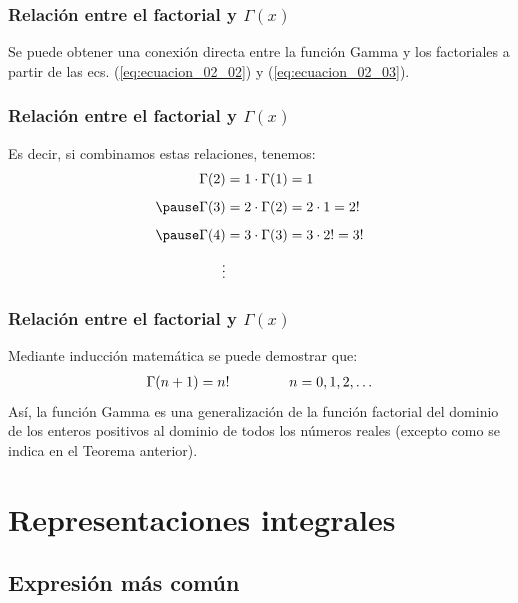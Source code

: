 \documentclass[12pt]{beamer}
\begin{document}
\begin{frame}
\frametitle{Relación entre el factorial y $\Gamma (x)$}
Se puede obtener una conexión directa entre la función Gamma y los factoriales a partir de las ecs. (\ref{eq:ecuacion_02_02}) y (\ref{eq:ecuacion_02_03}).
\end{frame}
\begin{frame}
\frametitle{Relación entre el factorial y $\Gamma (x)$}
Es decir, si combinamos estas relaciones, tenemos:
\pause
\begin{eqnarray*}
\begin{aligned}
\Gamma (2) &= 1 \cdot \Gamma(1) = 1 \\[0.5em] \pause 
\Gamma (3) &= 2 \cdot \Gamma(2) = 2 \cdot 1 = 2! \\[0.5em] \pause
\Gamma (4) &= 3 \cdot \Gamma(3) = 3 \cdot 2! = 3! \\[0.5em]
\vdots
\end{aligned}
\end{eqnarray*}
\end{frame}
\begin{frame}
\frametitle{Relación entre el factorial y $\Gamma (x)$}
Mediante inducción matemática se puede demostrar que:
\pause
\begin{align}
\Gamma (n + 1) = n! \hspace{1.5cm} n = 0, 1, 2, \ldots
\label{eq:ecuacion_02_04}
\end{align}
\pause
Así, la función Gamma es una generalización de la función factorial del dominio de los enteros positivos al dominio de todos los números reales (excepto como se indica en el Teorema anterior).
\end{frame}

\section{Representaciones integrales}
\subsection{Expresión más común}
\end{document}
